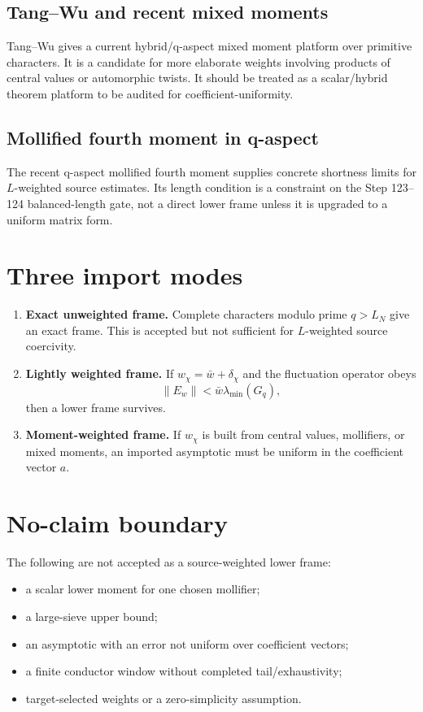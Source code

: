 \documentclass[11pt]{article}
\begin{document}
\subsection{Tang--Wu and recent mixed moments}
Tang--Wu gives a current hybrid/q-aspect mixed moment platform over primitive characters.  It is a candidate for more elaborate weights involving products of central values or automorphic twists.  It should be treated as a scalar/hybrid theorem platform to be audited for coefficient-uniformity.

\subsection{Mollified fourth moment in q-aspect}
The recent q-aspect mollified fourth moment supplies concrete shortness limits for $L$-weighted source estimates.  Its length condition is a constraint on the Step 123--124 balanced-length gate, not a direct lower frame unless it is upgraded to a uniform matrix form.

\section{Three import modes}
\begin{enumerate}
\item \textbf{Exact unweighted frame.} Complete characters modulo prime $q>L_N$ give an exact frame.  This is accepted but not sufficient for $L$-weighted source coercivity.
\item \textbf{Lightly weighted frame.} If $w_\chi=\bar w+\delta_\chi$ and the fluctuation operator obeys
\[
\|E_w\|<\bar w\lambda_{\min}(G_q),
\]
then a lower frame survives.
\item \textbf{Moment-weighted frame.} If $w_\chi$ is built from central values, mollifiers, or mixed moments, an imported asymptotic must be uniform in the coefficient vector $a$.
\end{enumerate}

\section{No-claim boundary}
The following are not accepted as a source-weighted lower frame:
\begin{itemize}
\item a scalar lower moment for one chosen mollifier;
\item a large-sieve upper bound;
\item an asymptotic with an error not uniform over coefficient vectors;
\item a finite conductor window without completed tail/exhaustivity;
\item target-selected weights or a zero-simplicity assumption.
\end{itemize}
\end{document}
